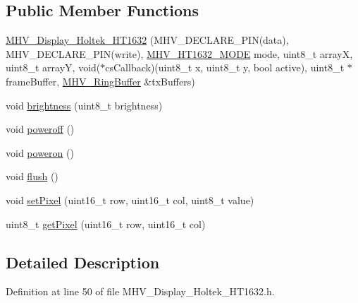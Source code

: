 \subsection*{\-Public \-Member \-Functions}
\begin{DoxyCompactItemize}
\item 
\hyperlink{class_m_h_v___display___holtek___h_t1632_ac3491073aa40004666aae9cefbffd14c}{\-M\-H\-V\-\_\-\-Display\-\_\-\-Holtek\-\_\-\-H\-T1632} (\-M\-H\-V\-\_\-\-D\-E\-C\-L\-A\-R\-E\-\_\-\-P\-I\-N(data), \-M\-H\-V\-\_\-\-D\-E\-C\-L\-A\-R\-E\-\_\-\-P\-I\-N(write), \hyperlink{_m_h_v___display___holtek___h_t1632_8h_a49097ad6362d784be39f7e83f5359011}{\-M\-H\-V\-\_\-\-H\-T1632\-\_\-\-M\-O\-D\-E} mode, uint8\-\_\-t array\-X, uint8\-\_\-t array\-Y, void($\ast$cs\-Callback)(uint8\-\_\-t x, uint8\-\_\-t y, bool active), uint8\-\_\-t $\ast$frame\-Buffer, \hyperlink{class_m_h_v___ring_buffer}{\-M\-H\-V\-\_\-\-Ring\-Buffer} \&tx\-Buffers)
\item 
void \hyperlink{class_m_h_v___display___holtek___h_t1632_a60620705276f1713dead13a4b440fed4}{brightness} (uint8\-\_\-t brightness)
\item 
void \hyperlink{class_m_h_v___display___holtek___h_t1632_a224e7f735441e8d381fb6148f2b64dda}{poweroff} ()
\item 
void \hyperlink{class_m_h_v___display___holtek___h_t1632_a2a9586d4c16483b4223a2fad453bc6bf}{poweron} ()
\item 
void \hyperlink{class_m_h_v___display___holtek___h_t1632_aeeb460d8c5ba0d8d43fb18779e50258e}{flush} ()
\item 
void \hyperlink{class_m_h_v___display___holtek___h_t1632_a664e9a5744bed3fa50a6adc9fcf80206}{set\-Pixel} (uint16\-\_\-t row, uint16\-\_\-t col, uint8\-\_\-t value)
\item 
uint8\-\_\-t \hyperlink{class_m_h_v___display___holtek___h_t1632_a32fe510b3bfa55a32e02a9570e67639d}{get\-Pixel} (uint16\-\_\-t row, uint16\-\_\-t col)
\end{DoxyCompactItemize}


\subsection{\-Detailed \-Description}


\-Definition at line 50 of file \-M\-H\-V\-\_\-\-Display\-\_\-\-Holtek\-\_\-\-H\-T1632.\-h.



